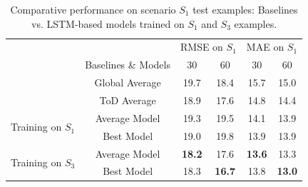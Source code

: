 \documentclass{ecai}
\begin{document}
\begin{table}
\caption{Comparative performance on scenario $S_1$ test examples: Baselines vs. LSTM-based models trained on $S_{1}$ and $S_{3}$ examples.}
\begin{center}
\label{tab:case3_case1}
\begin{tabular}{|c|c|c|c|c|c|}
	
    \cline{3-6}
	\multicolumn{2}{c}{} & \multicolumn{2}{|c|}{RMSE on $S_1$} & \multicolumn{2}{c|}{MAE on $S_1$}\\
	\cline{2-6}
	\multicolumn{1}{c|}{} & Baselines \& Models & 30 & 60 & 30 & 60\\
	\cline{2-6}
	\multicolumn{1}{c|}{} & Global Average & 19.7 & 18.4 & 15.7 & 15.0\\
    \multicolumn{1}{c|}{} & ToD Average & 18.9 & 17.6 & 14.8 & 14.4\\
	\hline 
	\multirow{2}{*}{Training on $S_{1}$} & Average Model & 19.3 & 19.5 & 14.1 & 13.9\\
	& Best Model & 19.0 & 19.8 & 13.9 & 13.9\\
	\hline
	\multirow{2}{*}{Training on $S_{3}$} & Average Model & \textbf{18.2} & 17.6 & \textbf{13.6} & 13.3\\
    & Best Model & 18.3 & \textbf{16.7} & 13.8 & \textbf{13.0}\\
	\hline
	

\end{tabular}
\end{center}
\end{table}





\end{document}
